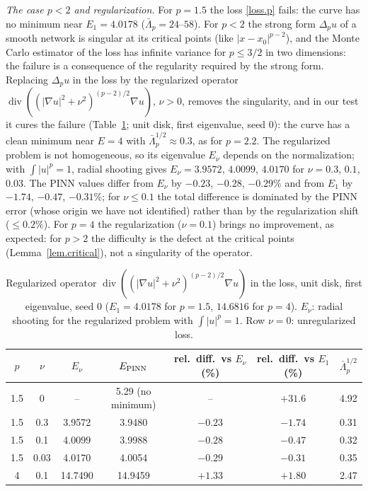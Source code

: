 \documentclass[10pt]{amsart}
\newenvironment{revblock}{\color{blue}}{}
\theoremstyle{definition}
\theoremstyle{remark}
\theoremstyle{plain}
\begin{document}
\begin{revblock}
\emph{The case $p<2$ and regularization.} For $p=1.5$ the loss \eqref{loss.p} fails: the curve has
no minimum near $E_1=4.0178$ ($\bar\Lambda_p=24$--$58$). For $p<2$ the strong form $\Delta_pu$ of a
smooth network is singular at its critical points (like $|x-x_0|^{p-2}$), and the Monte Carlo
estimator of the loss has infinite variance for $p\le3/2$ in two dimensions: the failure is a
consequence of the regularity required by the strong form. Replacing $\Delta_pu$ in the loss by the
regularized operator $\operatorname{div}((|\nabla u|^2+\nu^2)^{(p-2)/2}\nabla u)$, $\nu>0$, removes the
singularity, and in our test it cures the failure (Table~\ref{tab.plap.reg}; unit disk, first
eigenvalue, seed 0): the curve has a clean minimum near $E=4$ with $\bar\Lambda_p^{1/2}\approx0.3$, as
for $p=2.2$. The regularized problem is not homogeneous, so its eigenvalue $E_\nu$ depends on the
normalization; with $\int|u|^p=1$, radial shooting gives $E_\nu=3.9572$, $4.0099$, $4.0170$ for
$\nu=0.3$, $0.1$, $0.03$. The PINN values differ from $E_\nu$ by $-0.23$, $-0.28$, $-0.29\%$ and from
$E_1$ by $-1.74$, $-0.47$, $-0.31\%$; for $\nu\le0.1$ the total difference is dominated by the PINN error
(whose origin we have not identified) rather than by the regularization shift ($\le0.2\%$). For $p=4$ the
regularization ($\nu=0.1$) brings no improvement, as expected: for $p>2$ the difficulty is the defect at
the critical points (Lemma~\ref{lem.critical}), not a singularity of the operator.

\begin{table}[tbp]
\centering\small
\color{blue}
\caption{Regularized operator $\operatorname{div}((|\nabla u|^2+\nu^2)^{(p-2)/2}\nabla u)$ in the loss, unit disk, first eigenvalue, seed 0 ($E_1=4.0178$ for $p=1.5$, $14.6816$ for $p=4$). $E_\nu$: radial shooting for the regularized problem with $\int|u|^p=1$. Row $\nu=0$: unregularized loss.}
\label{tab.plap.reg}
\begin{tabular}{ccccccc}
\toprule
$p$ & $\nu$ & $E_\nu$ & $E_{\rm PINN}$ & rel.\ diff.\ vs $E_\nu$ (\%) & rel.\ diff.\ vs $E_1$ (\%) & $\bar\Lambda_p^{1/2}$\\
\midrule
1.5 & 0 & -- & 5.29 (no minimum) & -- & $+31.6$ & 4.92\\
1.5 & 0.3 & 3.9572 & 3.9480 & $-0.23$ & $-1.74$ & 0.31\\
1.5 & 0.1 & 4.0099 & 3.9988 & $-0.28$ & $-0.47$ & 0.32\\
1.5 & 0.03 & 4.0170 & 4.0054 & $-0.29$ & $-0.31$ & 0.35\\
4 & 0.1 & 14.7490 & 14.9459 & $+1.33$ & $+1.80$ & 2.47\\
\bottomrule
\end{tabular}
\end{table}
\end{revblock}
\end{document}
